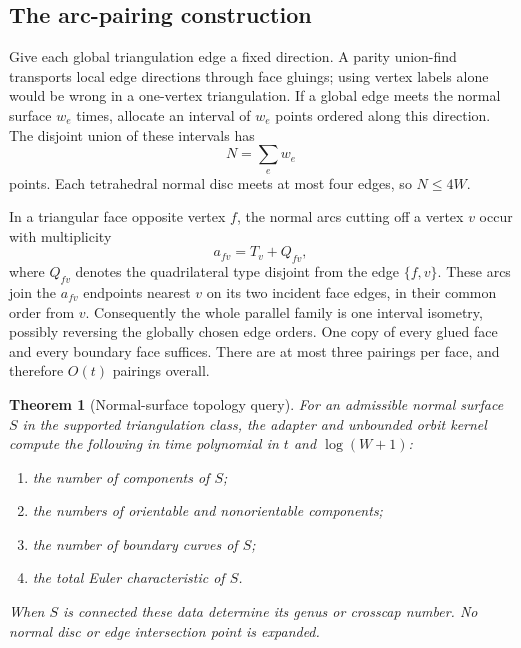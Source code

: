 \documentclass[11pt]{article}
\newtheorem{theorem}{Theorem}[section]
\theoremstyle{definition}
\begin{document}
\subsection{The arc-pairing construction}

Give each global triangulation edge a fixed direction. A parity
union-find transports local edge directions through face gluings; using
vertex labels alone would be wrong in a one-vertex triangulation. If a
global edge meets the normal surface $w_e$ times, allocate an interval
of $w_e$ points ordered along this direction. The disjoint union of
these intervals has
\[
                            N=\sum_e w_e
\]
points. Each tetrahedral normal disc meets at most four edges, so
$N\le4W$.

In a triangular face opposite vertex $f$, the normal arcs cutting off
a vertex $v$ occur with multiplicity
\[
                       a_{fv}=T_v+Q_{fv},
\]
where $Q_{fv}$ denotes the quadrilateral type disjoint from the edge
$\{f,v\}$. These arcs join the $a_{fv}$ endpoints nearest $v$ on its
two incident face edges, in their common order from $v$. Consequently
the whole parallel family is one interval isometry, possibly reversing
the globally chosen edge orders. One copy of every glued face and every
boundary face suffices. There are at most three pairings per face,
and therefore $O(t)$ pairings overall.

\begin{theorem}[Normal-surface topology query]
\label{thm:normal}
For an admissible normal surface $S$ in the supported triangulation
class, the adapter and unbounded orbit kernel compute the following in
time polynomial in $t$ and $\log(W+1)$:
\begin{enumerate}
\item the number of components of $S$;
\item the numbers of orientable and nonorientable components;
\item the number of boundary curves of $S$;
\item the total Euler characteristic of $S$.
\end{enumerate}
When $S$ is connected these data determine its genus or crosscap number.
No normal disc or edge intersection point is expanded.
\end{theorem}
\end{document}
